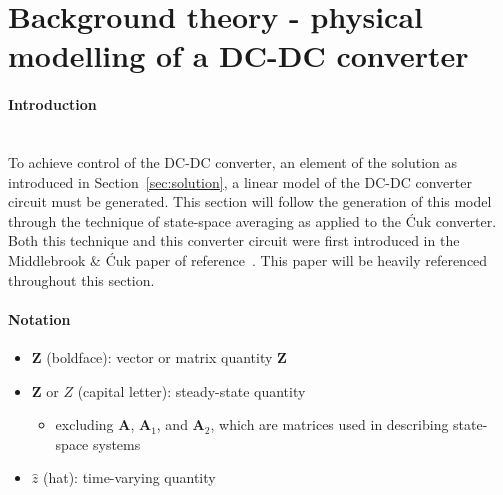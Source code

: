 \section{Background theory - physical modelling of a DC-DC converter}
\paragraph{Introduction}
~\\
To achieve control of the DC-DC converter, an element of the solution as introduced in Section~\ref{sec:solution}, a linear model of the DC-DC converter circuit must be generated. This section will follow the generation of this model through the technique of state-space averaging as applied to the \'Cuk converter. Both this technique and this converter circuit were first introduced in the Middlebrook \& \'Cuk paper of reference~\cite{cuk}. This paper will be heavily referenced throughout this section.
\paragraph{Notation}
\begin{itemize}
    \item $\boldsymbol{Z}$ (boldface): vector or matrix quantity $\boldsymbol{Z}$
    \item $\boldsymbol{Z}$ or $Z$ (capital letter): steady-state quantity
    \begin{itemize}
        \item excluding $\boldsymbol{A}$, $\boldsymbol{A}_1$, and $\boldsymbol{A}_2$, which are matrices used in describing state-space systems
    \end{itemize}
    \item $\hat{z}$ (hat): time-varying quantity
\end{itemize}
